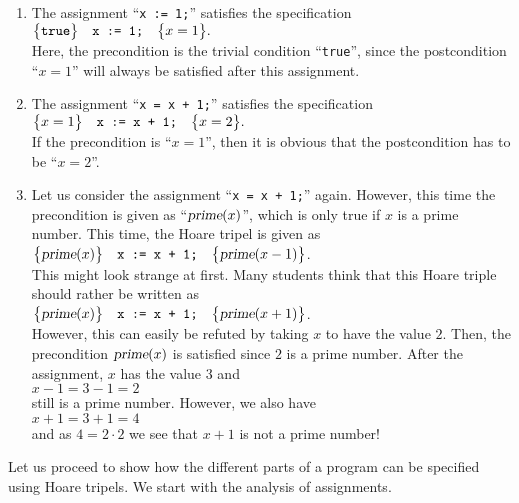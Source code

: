\examples
\begin{enumerate}
\item The assignment ``\texttt{x := 1;}'' satisfies the specification
      \\[0.2cm]
      \hspace*{1.3cm}
      $ \bigl\{\mathtt{true}\bigr\}\quad\texttt{x := 1;}\quad\bigl\{x = 1\bigr\}. $
      \\[0.2cm]
      Here, the precondition is the trivial condition ``\texttt{true}'', since
      the postcondition ``$x = 1$'' will always be satisfied after this assignment.
\item The assignment  ``\texttt{x = x + 1;}'' satisfies the specification
      \\[0.2cm]
      \hspace*{1.3cm}
      $ \bigl\{x=1\bigr\}\quad\texttt{x := x + 1;}\quad\bigl\{x=2\bigr\}. $
      \\[0.2cm]
      If the precondition is ``$x = 1$'', then it is obvious that the postcondition has to be  
      ``$x = 2$''.
\item Let us consider the assignment ``\texttt{x = x + 1;}'' again.  However, this time
      the precondition is given as ``$\textsl{prime}(x)$'', which is only true if $x$ is a
      prime number.  This time, the Hoare tripel is given as
      \\[0.2cm]
      \hspace*{1.3cm}
      $ \bigl\{\textsl{prime}(x)\bigr\}\quad\texttt{x := x + 1;}\quad\bigl\{\textsl{prime}(x-1)\bigr\}$.
      \\[0.2cm]
      This might look strange at first.  Many students think that this Hoare triple should rather
      be written as
      \\[0.2cm]
      \hspace*{1.3cm}
      $ \bigl\{\textsl{prime}(x)\bigr\}\quad\texttt{x := x + 1;}\quad\bigl\{\textsl{prime}(x+1)\bigr\} $.
      \\[0.2cm]
      However, this can easily be refuted by taking $x$ to have the value $2$.  Then, the
      precondition $\textsl{prime}(x)$ is satisfied since $2$ is a prime number.  After the
      assignment, $x$ has the value $3$ and
      \\[0.2cm]
      \hspace*{1.3cm}
      $x - 1 = 3 - 1 = 2$
      \\[0.2cm]
      still is a prime number.  However, we also have
      \\[0.2cm]
      \hspace*{1.3cm}
      $x + 1 = 3 + 1 = 4$ 
      \\[0.2cm]
      and as $4 = 2 \cdot 2$ we see that $x + 1$ is not a prime number!
\end{enumerate}
Let us proceed to show how the different parts of a program can be specified using Hoare tripels.
We start with the analysis of assignments.
 
